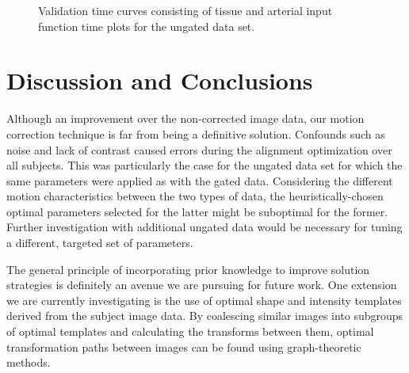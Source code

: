 \documentclass{llncs}
\begin{document}
    
\begin{figure}
  \caption{Validation time curves consisting of tissue and arterial input function time plots 
  for the ungated data set.}
  \label{fig:ungated}
\end{figure}



\section{Discussion and Conclusions}
Although an improvement over the non-corrected image data, our motion
correction technique is far from being a definitive solution. Confounds
such as noise and lack of contrast caused errors during the alignment
optimization over all subjects.  This was particularly the case for 
the ungated data set for which the same parameters were applied as with the 
gated data.  Considering the different motion characteristics between the two
types of data, the heuristically-chosen optimal parameters selected for the
latter might be suboptimal for the former.  Further investigation with 
additional ungated data would be necessary for tuning a different, targeted set
of parameters.

The general principle of incorporating prior knowledge 
to improve solution strategies is definitely an avenue we are pursuing
for future work.  One extension we are currently investigating is the 
use of optimal shape and intensity templates derived from the subject
image data.  By coalescing similar images into subgroups of optimal templates and calculating
the transforms between them, optimal transformation paths between images can be found
using graph-theoretic methods.



\end{document}
